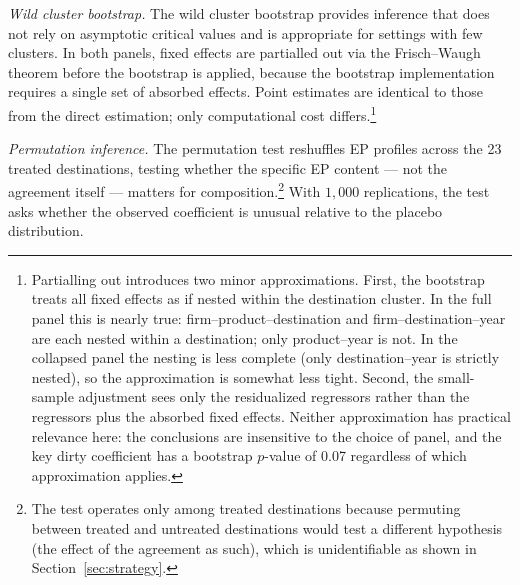 \documentclass[12pt]{article}
\begin{document}
\emph{Wild cluster bootstrap.}
The wild cluster bootstrap \citep{cameron2008, roodman2019} provides inference that does not rely on asymptotic critical values and is appropriate for settings with few clusters. In both panels, fixed effects are partialled out via the Frisch--Waugh theorem before the bootstrap is applied, because the bootstrap implementation requires a single set of absorbed effects. Point estimates are identical to those from the direct estimation; only computational cost differs.\footnote{Partialling out introduces two minor approximations. First, the bootstrap treats all fixed effects as if nested within the destination cluster. In the full panel this is nearly true: firm--product--destination and firm--destination--year are each nested within a destination; only product--year is not. In the collapsed panel the nesting is less complete (only destination--year is strictly nested), so the approximation is somewhat less tight. Second, the small-sample adjustment sees only the residualized regressors rather than the regressors plus the absorbed fixed effects. Neither approximation has practical relevance here: the conclusions are insensitive to the choice of panel, and the key dirty coefficient has a bootstrap $p$-value of 0.07 regardless of which approximation applies.}

\emph{Permutation inference.}
The permutation test reshuffles EP profiles across the 23 treated destinations, testing whether the specific EP content --- not the agreement itself --- matters for composition.\footnote{The test operates only among treated destinations because permuting between treated and untreated destinations would test a different hypothesis (the effect of the agreement as such), which is unidentifiable as shown in Section~\ref{sec:strategy}.} With $1{,}000$ replications, the test asks whether the observed coefficient is unusual relative to the placebo distribution.
\end{document}
